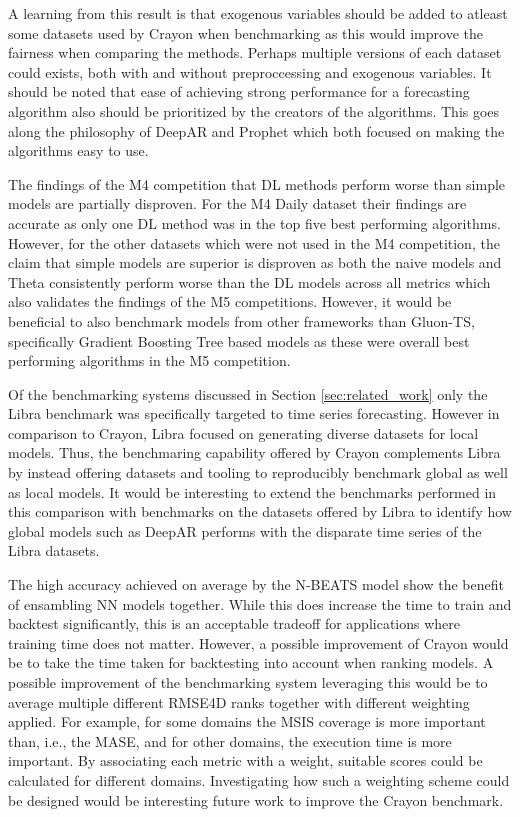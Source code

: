A learning from this result is that exogenous variables should be added to atleast some datasets used by Crayon when benchmarking as this would improve the fairness when comparing the methods. Perhaps multiple versions of each dataset could exists, both with and without preproccessing and exogenous variables. It should be noted that ease of achieving strong performance for a forecasting algorithm also should be prioritized by the creators of the algorithms. This goes along the philosophy of DeepAR and Prophet which both focused on making the algorithms easy to use.

The findings of the M4 competition that DL methods perform worse than simple models are partially disproven. For the M4 Daily dataset their findings are accurate as only one DL method was in the top five best performing algorithms. However, for the other datasets which were not used in the M4 competition, the claim that simple models are superior is disproven as both the naive models and Theta consistently perform worse than the DL models across all metrics which also validates the findings of the M5 competitions. However, it would be beneficial to also benchmark models from other frameworks than Gluon-TS, specifically Gradient Boosting Tree based models as these were overall best performing algorithms in the M5 competition.

Of the benchmarking systems discussed in Section \ref{sec:related_work} only the Libra benchmark was specifically targeted to time series forecasting. However in comparison to Crayon, Libra focused on generating diverse datasets for local models. Thus, the benchmaring capability offered by Crayon complements Libra by instead offering datasets and tooling to reproducibly benchmark global as well as local models. It would be interesting to extend the benchmarks performed in this comparison with benchmarks on the datasets offered by Libra to identify how global models such as DeepAR performs with the disparate time series of the Libra datasets.

The high accuracy achieved on average by the N-BEATS model show the benefit of ensambling NN models together. While this does increase the time to train and backtest significantly, this is an acceptable tradeoff for applications where training time does not matter. However, a possible improvement of Crayon would be to take the time taken for backtesting into account when ranking models. A possible improvement of the benchmarking system leveraging this would be to average multiple different RMSE4D ranks together with different weighting applied. For example, for some domains the MSIS coverage is more important than, i.e., the MASE, and for other domains, the execution time is more important. By associating each metric with a weight, suitable scores could be calculated for different domains. Investigating how such a weighting scheme could be designed would be interesting future work to improve the Crayon benchmark.

